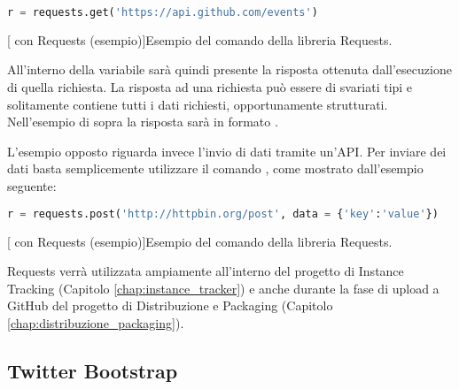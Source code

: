             \begin{center}
                \begin{lstlisting}[language=python, gobble=18]
                    r = requests.get('https://api.github.com/events')
                \end{lstlisting}
                \captionsetup{textformat=empty,labelformat=empty} \vspace{-2em}
                [ con Requests (esempio)]{Esempio del comando  della libreria Requests.}
            \end{center}
            
            All'interno della variabile  sarà quindi presente la risposta ottenuta dall'esecuzione di quella richiesta. La risposta ad una richiesta può essere di svariati tipi e solitamente contiene tutti i dati richiesti, opportunamente strutturati. Nell'esempio di sopra la risposta sarà in formato .
            
            L'esempio opposto riguarda invece l'invio di dati tramite un'\ac{API}. Per inviare dei dati basta semplicemente utilizzare il comando , come mostrato dall'esempio seguente:
            
            \begin{center}
                \begin{lstlisting}[language=python, gobble=18]
                    r = requests.post('http://httpbin.org/post', data = {'key':'value'})
                \end{lstlisting}
                \captionsetup{textformat=empty,labelformat=empty} \vspace{-2em}
                [ con Requests (esempio)]{Esempio del comando  della libreria Requests.}
            \end{center}
            
            Requests verrà utilizzata ampiamente all'interno del progetto di Instance Tracking (Capitolo \ref{chap:instance_tracker}) e anche durante la fase di upload a GitHub del progetto di Distribuzione e Packaging (Capitolo \ref{chap:distribuzione_packaging}).
        
        \subsection{Twitter Bootstrap} \label{subsec:p;sl;twitter_bootstrap}
        
